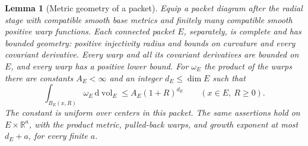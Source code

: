 \documentclass[11pt]{article}
\numberwithin{equation}{section}
\newtheorem{lemma}[theorem]{Lemma}
\theoremstyle{definition}
\theoremstyle{remark}
\begin{document}
\begin{lemma}[Metric geometry of a packet]\label{packet:geometry}
Equip a packet diagram after the radial stage with compatible smooth
base metrics and finitely many compatible smooth positive warp
functions.  Each connected packet $E$, separately, is complete and
has bounded geometry: positive injectivity radius and bounds on
curvature and every covariant derivative.  Every warp and all its
covariant derivatives are bounded on $E$, and every warp has a positive
lower bound.  For $\omega_E$ the product of the warps there are constants
$A_E<\infty$ and an integer $d_E\le\dim E$ such that
\begin{equation}\label{packet:growth}
 \int_{B_E(x,R)}\omega_E\,\mathrm d\operatorname{vol}_E
       \le A_E(1+R)^{d_E}
       \qquad(x\in E,\ R\ge0).
\end{equation}
The constant is uniform over centers in this packet.  The same assertions
hold on $E\times\mathbb R^a$, with the product metric, pulled-back warps,
and growth exponent at most $d_E+a$, for every finite $a$.
\end{lemma}
\end{document}
